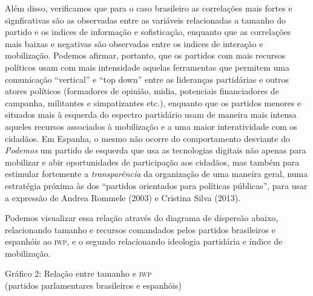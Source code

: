 Além disso, verificamos que para o caso brasileiro as correlações mais
fortes e signficativas são as observadas entre as variáveis relacionadas
a tamanho do partido e os indices de informação e sofisticação, enquanto
que as correlações mais baixas e negativas são observadas entre os
indices de interação e mobilização. Podemos afirmar, portanto, que os
partidos com mais recursos políticos usam com mais intensidade aquelas
ferramentas que permitem uma comunicação ``vertical'' e ``top down'' entre
as lideranças partidárias e outros atores políticos (formadores de
opinião, midia, potenciais financiadores de campanha, militantes e
simpatizantes etc.), enquanto que os partidos menores e situados mais à
esquerda do espectro partidário usam de maneira mais intensa aqueles
recursos associados à mobilização e a uma maior interatividade com os
cidadãos. Em Espanha, o mesmo não ocorre do comportamento desviante do
\emph{Podemos} um partido de esquerda que usa as tecnologias digitais
não apenas para mobilizar e abir oportunidades de participação aos
cidadãos, mas também para estimular fortemente a \emph{transparência} da
organização de uma maneira geral, numa estratégia próxima às dos
``partidos orientados para políticas públicas'', para usar a expressão
de Andrea Rommele (2003) e Cristina Silva (2013).

Podemos visualizar essa relação através do diagrama de dispersão abaixo,
relacionando tamanho e recursos comandados pelos partidos brasileiros e
espanhóis ao \textsc{iwp}, e o segundo relacionando ideologia partidária e índice
de mobilização.

\begin{center}
Gráfico 2: Relação entre tamanho e \textsc{iwp}\\ (partidos parlamentares
brasileiros e espanhóis)
\end{center}


